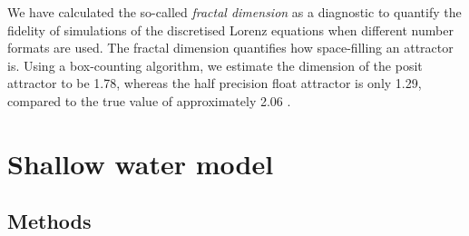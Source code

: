 \documentclass[draft]{agujournal2019}
\begin{document}
We have calculated the so-called \emph{fractal dimension} as a diagnostic to quantify the fidelity of simulations of the discretised Lorenz equations when different number formats are used. The fractal dimension quantifies how space-filling an attractor is. Using a box-counting algorithm, we estimate the dimension of the posit attractor to be 1.78, whereas the half precision float attractor is only 1.29, compared to the true value of approximately 2.06 \cite{Grassberger1983,McGuinness1983}. 


\section{Shallow water model}
\label{sec:swm}

\subsection{Methods}
\label{sec:swm_methods}
\end{document}
